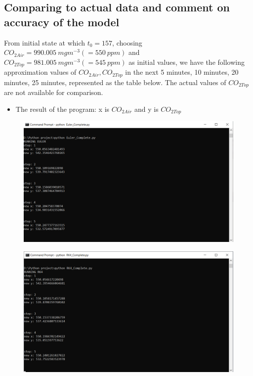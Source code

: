 \documentclass[a4paper]{article}
\numberwithin{equation}{section}
\begin{document}
\subsection{Comparing to actual data and comment on accuracy of the model}
From initial state at which \(t_{0} = 157\), choosing \(CO_{2Air} = 990.005~mg m^{-3}  (= 550~ ppm)\) and \(CO_{2Top} = 981.005 ~ mg m^{-3} (=545~ppm)\) as initial values, we have the following approximation values of \(CO_{2Air}, CO_{2Top}\) in the next 5 minutes, 10 minutes, 20 minutes, 25 minutes, represented as the table below. The actual values of \(CO_{2Top}\) are not available for comparison.

\begin{itemize}
    \item The result of the program: x is $CO_{2Air}$ and y is $CO_{2Top}$
\end{itemize}

\begin{figure}[H]
  \centering
  \includegraphics[width=15cm]{Result3_Euler.png}
\end{figure}
\begin{figure}[H]
  \centering
  \includegraphics[width=15cm]{Result3_RK4.png}
\end{figure}
\end{document}
